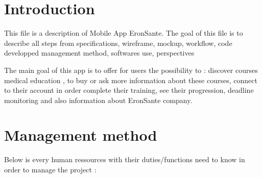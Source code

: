 \documentclass[
  12pt,
]{article}
\begin{document}
\hypertarget{introduction}{%
\section{Introduction}\label{introduction}}

This file is a description of Mobile App EronSante. The goal of this
file is to describe all steps from specifications, wireframe, mockup,
workflow, code developped management method, softwares use, perspectives

The main goal of this app is to offer for users the possibility to :
discover courses medical education , to buy or ask more information
about these courses, connect to their account in order complete their
training, see their progression, deadline monitoring and also
information about EronSante company.

\hypertarget{management-method}{%
\section{Management method}\label{management-method}}

Below is every human ressources with their duties/functions need to know
in order to manage the project :
\end{document}
